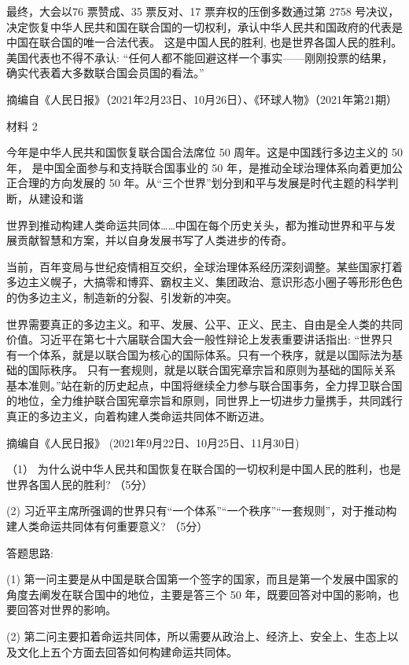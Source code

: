 \documentclass[UTF8,11pt]{ctexart}
\begin{document}
最终，大会以76 票赞成、35 票反对、17 票弃权的压倒多数通过第 2758 号决议，决定恢复中华人民共和国在联合国的一切权利，承认中华人民共和国政府的代表是中国在联合国的唯一合法代表。 这是中国人民的胜利, 也是世界各国人民的胜利。美国代表也不得不承认: “任何人都不能回避这样一个事实——刚刚投票的结果，确实代表着大多数联合国会员国的看法。”

摘编自《人民日报》（2021年2月23日、10月26日）、《环球人物》（2021年第21期）

材料 2

今年是中华人民共和国恢复联合国合法席位 50 周年。这是中国践行多边主义的 50 年， 是中国全面参与和支持联合国事业的 50 年，是推动全球治理体系向着更加公正合理的方向发展的 50 年。从“三个世界”划分到和平与发展是时代主题的科学判断，从建设和谐

世界到推动构建人类命运共同体……中国在每个历史关头，都为推动世界和平与发展贡献智慧和方案，并以自身发展书写了人类进步的传奇。

当前，百年变局与世纪疫情相互交织，全球治理体系经历深刻调整。某些国家打着多边主义幌子，大搞零和博弈、霸权主义、集团政治、意识形态小圈子等形形色色的伪多边主义，制造新的分裂、引发新的冲突。

世界需要真正的多边主义。和平、发展、公平、正义、民主、自由是全人类的共同价值。习近平在第七十六届联合国大会一般性辩论上发表重要讲话指出: “世界只有一个体系，就是以联合国为核心的国际体系。只有一个秩序，就是以国际法为基础的国际秩序。 只有一套规则，就是以联合国宪章宗旨和原则为基础的国际关系基本准则。”站在新的历史起点，中国将继续全力参与联合国事务，全力捍卫联合国的地位，全力维护联合国宪章宗旨和原则，同世界上一切进步力量携手，共同践行真正的多边主义，向着构建人类命运共同体不断迈进。

摘编自《人民日报》 (2021年9月22日、10月25日、11月30日)

（1） 为什么说中华人民共和国恢复在联合国的一切权利是中国人民的胜利，也是世界各国人民的胜利? （5分）

(2) 习近平主席所强调的世界只有“一个体系”“一个秩序”“一套规则”，对于推动构建人类命运共同体有何重要意义? （5分）

答题思路:

(1) 第一问主要是从中国是联合国第一个签字的国家，而且是第一个发展中国家的角度去阐发在联合国中的地位，主要是答三个 50 年，既要回答对中国的影响，也要回答对世界的影响。

(2) 第二问主要扣着命运共同体，所以需要从政治上、经济上、安全上、生态上以及文化上五个方面去回答如何构建命运共同体。
\end{document}
